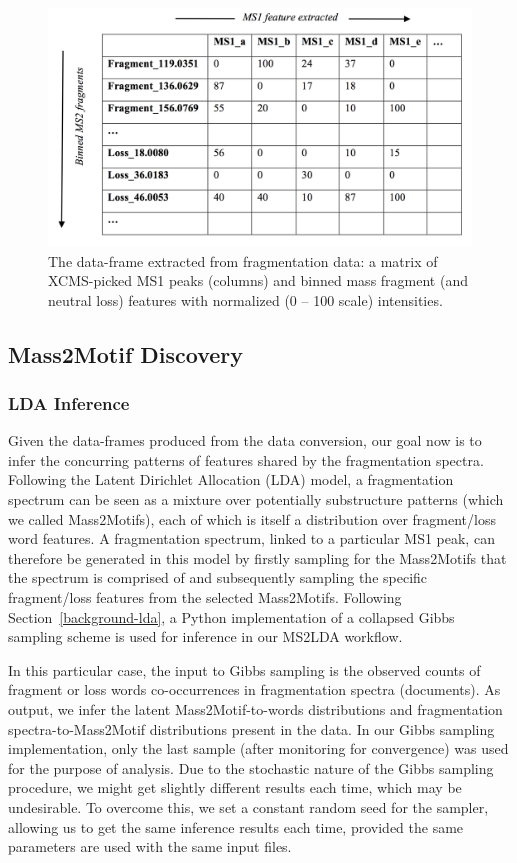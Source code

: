 \begin{figure}[!htbp]
\centering\includegraphics[width=0.7\linewidth]{07-lda/figures/matrix.png}
\centering\caption{The data-frame extracted from fragmentation data: a matrix of XCMS-picked MS1 peaks (columns) and binned mass fragment (and neutral loss) features with normalized (0 – 100 scale) intensities.\label{fig:m2lda-workflow}}
\end{figure}

\subsection{Mass2Motif Discovery\label{sub:topic-discovery}}

\subsubsection{LDA Inference}

Given the data-frames produced from the data conversion, our goal now is to infer the concurring patterns of features shared by the fragmentation spectra. Following the Latent Dirichlet Allocation (LDA) model, a fragmentation spectrum can be seen as a mixture over potentially substructure patterns (which we called Mass2Motifs), each of which is itself a distribution over fragment/loss word features. A fragmentation spectrum, linked to a particular MS1 peak, can therefore be generated in this model by firstly sampling for the Mass2Motifs that the spectrum is comprised of and subsequently sampling the specific fragment/loss features from the selected Mass2Motifs. Following Section~\ref{background-lda}, a Python implementation of a collapsed Gibbs sampling scheme is used for inference in our MS2LDA workflow. 

In this particular case, the input to Gibbs sampling is the observed counts of fragment or loss words co-occurrences in fragmentation spectra (documents). As output, we infer the latent Mass2Motif-to-words distributions and fragmentation spectra-to-Mass2Motif distributions present in the data. In our Gibbs sampling implementation, only the last sample (after monitoring for convergence) was used for the purpose of analysis. Due to the stochastic nature of the Gibbs sampling procedure, we might get slightly different results each time, which may be undesirable. To overcome this, we set a constant random seed for the sampler, allowing us to get the same inference results each time, provided the same parameters are used with the same input files.


